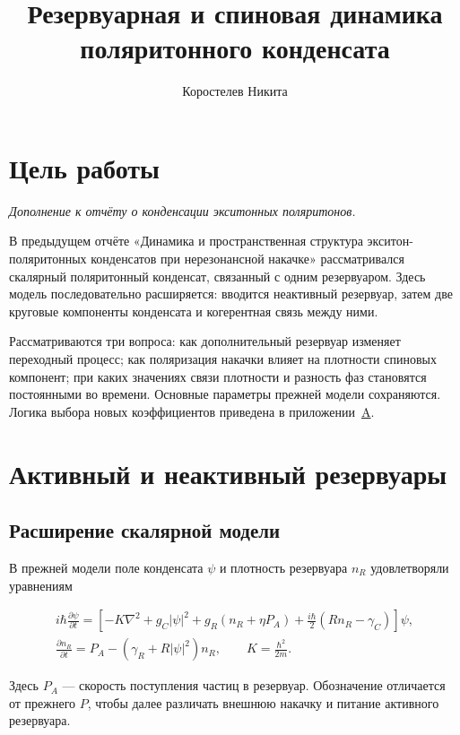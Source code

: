 \documentclass[12pt,a4paper]{article}
\title{Резервуарная и спиновая динамика поляритонного конденсата}
\author{Коростелев Никита}
\date{}
\begin{document}
\maketitle
\clearpage

\section*{Цель работы}
\textit{Дополнение к отчёту о конденсации экситонных поляритонов.}


В предыдущем отчёте «Динамика и пространственная структура экситон-поля\-ри\-тонных конденсатов при нерезонансной накачке» рассматривался скалярный поляритонный конденсат, связанный с одним резервуаром. Здесь модель последовательно расширяется: вводится неактивный резервуар, затем две круговые компоненты конденсата и когерентная связь между ними.

Рассматриваются три вопроса: как дополнительный резервуар изменяет переходный процесс; как поляризация накачки влияет на плотности спиновых компонент; при каких значениях связи плотности и разность фаз становятся постоянными во времени. Основные параметры прежней модели сохраняются. Логика выбора новых коэффициентов приведена в приложении~\hyperref[sec:A]{A}.

\section{Активный и неактивный резервуары}\label{sec:1}

\subsection{Расширение скалярной модели}\label{sec:1.1}

В прежней модели поле конденсата \(\psi\) и плотность резервуара \(n_R\) удовлетворяли уравнениям

\begin{equation}\label{eq:1}
\begin{gathered}
i\hbar\frac{\partial\psi}{\partial t}
=
\left[
-K\nabla^2+g_C|\psi|^2
+g_R(n_R+\eta P_A)
+\frac{i\hbar}{2}(Rn_R-\gamma_C)
\right]\psi,\\[0.5em]
\frac{\partial n_R}{\partial t}
=
P_A-(\gamma_R+R|\psi|^2)n_R,
\qquad
K=\frac{\hbar^2}{2m}.
\end{gathered}
\end{equation}

Здесь \(P_A\) — скорость поступления частиц в резервуар. Обозначение отличается от прежнего \(P\), чтобы далее различать внешнюю накачку и питание активного резервуара.
\end{document}
